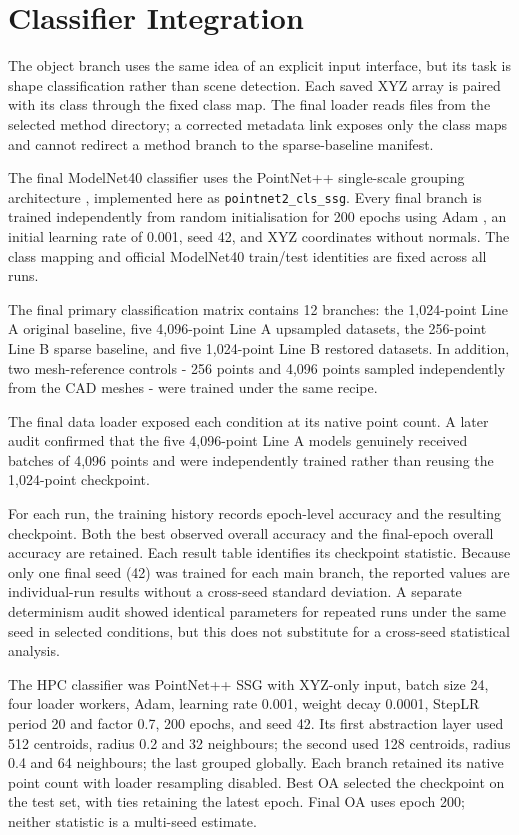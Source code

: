 \section{Classifier Integration}
\label{sec:fc-4-9}

\label{sec:fc-4-9-1}

The object branch uses the same idea of an explicit input interface,
but its task is shape classification rather than scene detection.
Each saved XYZ array is paired with its class through the fixed
class map. The final loader reads files from the selected method
directory; a corrected metadata link exposes only the class maps
and cannot redirect a method branch to the sparse-baseline manifest.

The final ModelNet40 classifier uses the PointNet++ single-scale grouping architecture \cite{qi2017pointnetpp}, implemented here as \texttt{pointnet2\_cls\_ssg}. Every final branch is trained independently from random initialisation for 200 epochs using Adam \cite{kingma2015adam}, an initial learning rate of 0.001, seed 42, and XYZ coordinates without normals. The class mapping and official ModelNet40 train/test identities are fixed across all runs.

The final primary classification matrix contains 12 branches: the 1,024-point Line A original baseline, five 4,096-point Line A upsampled datasets, the 256-point Line B sparse baseline, and five 1,024-point Line B restored datasets. In addition, two mesh-reference controls - 256 points and 4,096 points sampled independently from the CAD meshes - were trained under the same recipe.

The final data loader exposed each condition at its native point count. A later audit confirmed that the five 4,096-point Line A models genuinely received batches of 4,096 points and were independently trained rather than reusing the 1,024-point checkpoint.

For each run, the training history records epoch-level accuracy and the resulting checkpoint. Both the best observed overall accuracy and the final-epoch overall accuracy are retained. Each result table identifies its checkpoint statistic. Because only one final seed (42) was trained for each main branch, the reported values are individual-run results without a cross-seed standard deviation. A separate determinism audit showed identical parameters for repeated runs under the same seed in selected conditions, but this does not substitute for a cross-seed statistical analysis.

\label{sec:classifier-setup}
The HPC classifier was PointNet++ SSG with XYZ-only input, batch size 24,
four loader workers, Adam, learning rate 0.001, weight decay 0.0001,
StepLR period 20 and factor 0.7, 200 epochs, and seed 42. Its first abstraction layer used 512 centroids,
radius 0.2 and 32 neighbours; the second used 128 centroids, radius 0.4
and 64 neighbours; the last grouped globally. Each branch retained its
native point count with loader resampling disabled. Best OA selected the
checkpoint on the test set, with ties retaining the latest epoch. Final OA
uses epoch 200; neither statistic is a multi-seed estimate.

